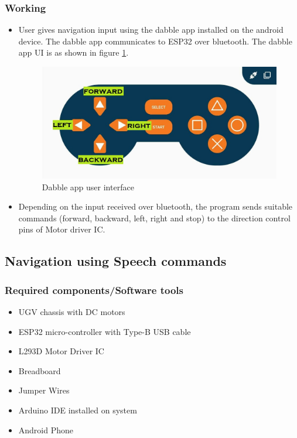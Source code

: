 \subsubsection{Working}
\begin{itemize}
    \item User gives navigation input using the dabble app installed on the android device. The dabble app communicates to ESP32 over bluetooth. The dabble app UI is as shown in figure \ref{Dabble_app_UI}.
    
    \begin{figure}[h!]
    \centering
    \includegraphics[width=12cm]{./Figures/Dabble_app_UI.jpg}
    \caption{Dabble app user interface}
    \label{Dabble_app_UI}
    \end{figure}
    
    \item Depending on the input received over bluetooth, the program sends suitable commands (forward, backward, left, right and stop) to the direction control pins of Motor driver IC.
\end{itemize}

\clearpage
\newpage
\subsection{Navigation using Speech commands} 
\subsubsection{Required components/Software tools}
\begin{itemize}
    \item  UGV chassis with DC motors
    \item  ESP32 micro-controller with Type-B USB cable
    \item  L293D Motor Driver IC
    \item  Breadboard
    \item  Jumper Wires
    \item  Arduino IDE installed on system
    \item Android Phone
\end{itemize}

